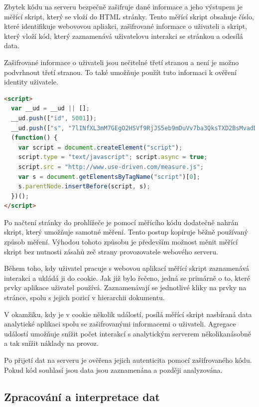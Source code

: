 \documentclass[bc,female,java,dept456]{diploma}						%
\begin{document}
Zbytek kódu na serveru bezpečně zašifruje dané informace a jeho výstupem je měřící skript, který se vloží do HTML stránky. Tento měřící skript obsahuje číslo, které identifikuje webovovou apliakci, zašifrované informace o uživateli a skript, který vloží kód, který zaznamenává uživatelovu interakci se stránkou a odesílá data.

Zašifrované informace o uživateli jsou nečitelné třetí stranou a není je možno podvrhnout třetí stranou. To také umožňuje použít tuto informaci k ověření identity uživatele.

\begin{lstlisting}[label=src:html,caption=Měřící skript,language=HTML]
<script> 
  var __ud = __ud || [];  
  __ud.push(["id", 5001]);
  __ud.push(["s", "7lINfXL3mM7GEgO2HSVf9RjJS5eb9mDuVv7ba3QksTXD2BsMvadDPeU-CoIzid5PDqJI6gCOi0EjmEGtI6XSDbu9at9vY8fw6rwssCDJVA2dfuZYF7kDwzpjzivNO OfAXQls78FzwcjDhc-gxwHohMAa0l9mb7MMlV5JcDDnx7A"]);
  (function() {
    var script = document.createElement("script");
    script.type = "text/javascript"; script.async = true;
    script.src = "http://www.use-driven.com/measure.js";
    var s = document.getElementsByTagName("script")[0]; 
    s.parentNode.insertBefore(script, s);
  })();
</script> 
\end{lstlisting}


Po načtení stránky do prohlížeče je pomocí měřícího kódu dodatečně nahrán skript, který umožňuje samotné měření. Tento postup kopíruje běžně používaný způsob měření. Výhodou tohoto způsobu je především možnost měnit měřící skript bez nutnosti zásahů zeč strany provozovatele webového serveru.

Během toho, kdy uživatel pracuje s webovou aplikací měřící skript zaznamenává interakci a ukládá ji do cookie. Jak již bylo řečeno, jedná se primárně o to, které prvky aplikace uživatel používá. Zaznamenávají se jednotlivé kliky na prvky na stránce, spolu s jejich pozicí v hierarchii dokumentu.

V okamžiku, kdy je v cookie několik událostí, posílá měřící skript nasbíraná data analytické aplikaci spolu se zašifrovanými informacemi o uživateli. Agregace událostí umožňuje snížit počet interakcí s analytickým serverem několikanásobně a tak snížit náklady na provoz.

Po přijetí dat na serveru je ověřena jejich autenticita pomocí zašifrovaného kódu. Pokud kód souhlasí jsou data jsou zaznamenána a později analyzována.


\subsection{Zpracování a interpretace dat}
\end{document}
